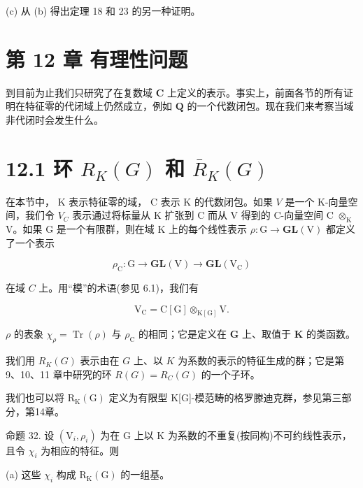 \documentclass[10pt]{article}
\begin{document}
(c) 从 (b) 得出定理 18 和 23 的另一种证明。

\section*{第 12 章 有理性问题}

到目前为止我们只研究了在复数域 \(\mathbf{C}\) 上定义的表示。事实上，前面各节的所有证明在特征零的代闭域上仍然成立，例如 \(\mathbf{Q}\) 的一个代数闭包。现在我们来考察当域非代闭时会发生什么。

\section*{12.1 环 \({R}_{K}\left( G\right)\) 和 \({\bar{R}}_{K}\left( G\right)\)}

在本节中， \(\mathrm{K}\) 表示特征零的域， \(\mathrm{C}\) 表示 K 的代数闭包。如果 \(V\) 是一个 K-向量空间，我们令 \({V}_{C}\) 表示通过将标量从 K 扩张到 C 而从 V 得到的 C-向量空间 C \({ \otimes  }_{\mathrm{K}}\) V。如果 G 是一个有限群，则在域 \(\mathrm{K}\) 上的每个线性表示 \(\rho  : \mathrm{G} \rightarrow  \mathbf{{GL}}\left( \mathrm{V}\right)\) 都定义了一个表示

\[
{\rho }_{\mathrm{C}} : \mathrm{G} \rightarrow  \mathbf{{GL}}\left( \mathrm{V}\right)  \rightarrow  \mathbf{{GL}}\left( {\mathrm{V}}_{\mathrm{C}}\right)
\]

在域 \(C\) 上。用“模”的术语(参见 6.1)，我们有

\[
{\mathrm{V}}_{\mathrm{C}} = \mathrm{C}\left\lbrack  \mathrm{G}\right\rbrack  { \otimes  }_{\mathrm{K}\left\lbrack  \mathrm{G}\right\rbrack  }\mathrm{V}.
\]

\(\rho\) 的表象 \({\chi }_{\rho } = \operatorname{Tr}\left( \rho \right)\) 与 \({\rho }_{\mathrm{C}}\) 的相同；它是定义在 \(\mathbf{G}\) 上、取值于 \(\mathbf{K}\) 的类函数。

我们用 \({R}_{K}\left( G\right)\) 表示由在 \(G\) 上、以 \(K\) 为系数的表示的特征生成的群；它是第 9、10、11 章中研究的环 \(R\left( G\right)  = {R}_{C}\left( G\right)\) 的一个子环。

我们也可以将 \({\mathrm{R}}_{\mathrm{K}}\left( \mathrm{G}\right)\) 定义为有限型 K[G]-模范畴的格罗滕迪克群，参见第三部分，第14章。

命题 32. 设 \(\left( {{\mathrm{V}}_{i},{\rho }_{i}}\right)\) 为在 \(\mathrm{G}\) 上以 \(\mathrm{K}\) 为系数的不重复(按同构)不可约线性表示，且令 \({\chi }_{i}\) 为相应的特征。则

(a) 这些 \({\chi }_{i}\) 构成 \({\mathrm{R}}_{\mathrm{K}}\left( \mathrm{G}\right)\) 的一组基。
\end{document}
